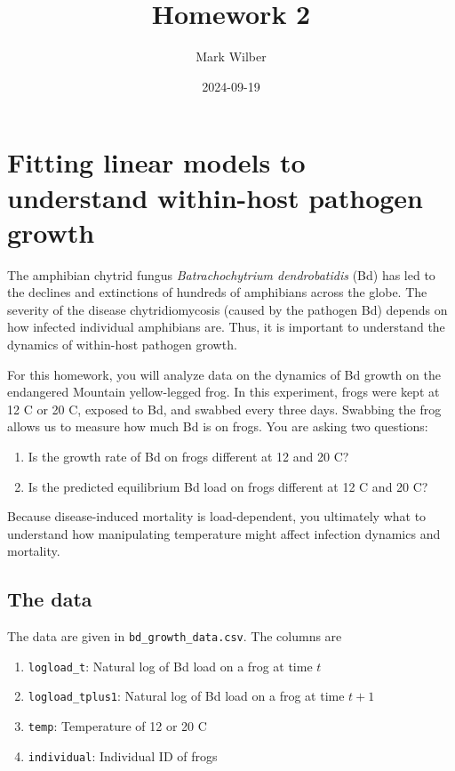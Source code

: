 \documentclass[
]{article}
\title{Homework 2}
\author{Mark Wilber}
\date{2024-09-19}
\providecommand{\tightlist}{%
  \setlength{\itemsep}{0pt}\setlength{\parskip}{0pt}}
\begin{document}
\maketitle

\section{Fitting linear models to understand within-host pathogen
growth}\label{fitting-linear-models-to-understand-within-host-pathogen-growth}

The amphibian chytrid fungus \emph{Batrachochytrium dendrobatidis} (Bd)
has led to the declines and extinctions of hundreds of amphibians across
the globe. The severity of the disease chytridiomycosis (caused by the
pathogen Bd) depends on how infected individual amphibians are. Thus, it
is important to understand the dynamics of within-host pathogen growth.

For this homework, you will analyze data on the dynamics of Bd growth on
the endangered Mountain yellow-legged frog. In this experiment, frogs
were kept at 12 C or 20 C, exposed to Bd, and swabbed every three days.
Swabbing the frog allows us to measure how much Bd is on frogs. You are
asking two questions:

\begin{enumerate}
\def\labelenumi{\arabic{enumi}.}
\tightlist
\item
  Is the growth rate of Bd on frogs different at 12 and 20 C?
\item
  Is the predicted equilibrium Bd load on frogs different at 12 C and 20
  C?
\end{enumerate}

Because disease-induced mortality is load-dependent, you ultimately what
to understand how manipulating temperature might affect infection
dynamics and mortality.

\subsection{The data}\label{the-data}

The data are given in \texttt{bd\_growth\_data.csv}. The columns are

\begin{enumerate}
\def\labelenumi{\arabic{enumi}.}
\tightlist
\item
  \texttt{logload\_t}: Natural log of Bd load on a frog at time \(t\)
\item
  \texttt{logload\_tplus1}: Natural log of Bd load on a frog at time
  \(t + 1\)
\item
  \texttt{temp}: Temperature of 12 or 20 C
\item
  \texttt{individual}: Individual ID of frogs
\end{enumerate}
\end{document}
